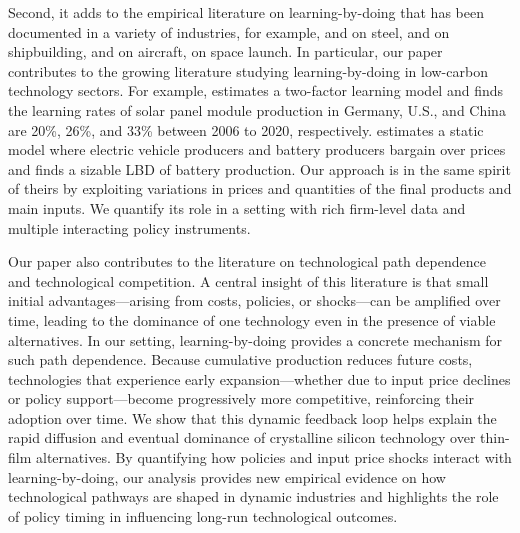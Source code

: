 \documentclass[12pt]{article}
\begin{document}
Second, it adds to the empirical literature on learning-by-doing that has been documented in a variety of industries, for example, \citet{head1994infant} and \citet{ohashi2005learning} on steel, \citet{thompson2001much} and \citet{thornton2001learning} on shipbuilding, \citet{benkard2000learning} and \citet{benkard2004dynamic} on aircraft, \citet{su2025LBD} on space launch.  %
In particular, our paper contributes to the growing literature studying learning-by-doing in low-carbon technology sectors. For example, \citet{helveston2022quantifying} estimates a two-factor learning model and finds the learning rates of solar panel module production in Germany, U.S., and China are 20\%, 26\%, and 33\% between 2006 to 2020, respectively. \citet{barwick2025drive} estimates a static model where electric vehicle producers and battery producers bargain over prices and finds a sizable LBD of battery production. 
Our approach is in the same spirit of theirs by exploiting variations in prices and quantities of the final products and main inputs. We quantify its role in a setting with rich firm-level data and multiple interacting policy instruments. 


Our paper also contributes to the literature on technological path dependence and technological competition. A central insight of this literature is that small initial advantages—arising from costs, policies, or shocks—can be amplified over time, leading to the dominance of one technology even in the presence of viable alternatives. In our setting, learning-by-doing provides a concrete mechanism for such path dependence. Because cumulative production reduces future costs, technologies that experience early expansion—whether due to input price declines or policy support—become progressively more competitive, reinforcing their adoption over time. We show that this dynamic feedback loop helps explain the rapid diffusion and eventual dominance of crystalline silicon technology over thin-film alternatives. By quantifying how policies and input price shocks interact with learning-by-doing, our analysis provides new empirical evidence on how technological pathways are shaped in dynamic industries and highlights the role of policy timing in influencing long-run technological outcomes.
\end{document}
